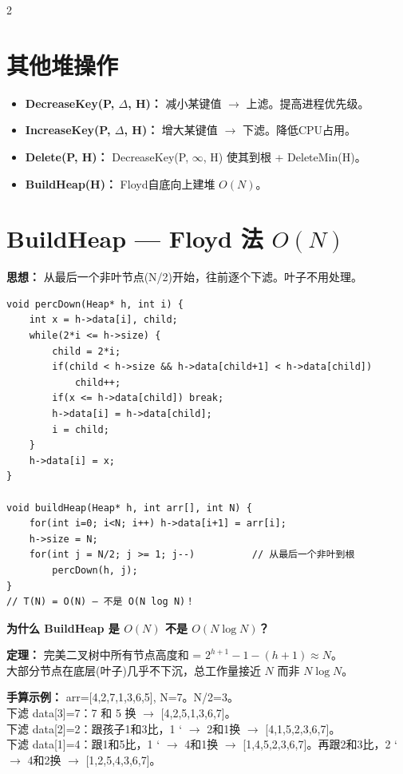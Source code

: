 \documentclass[10pt,a4paper]{article}
\begin{document}
\begin{multicols}{2}
\columnbreak

\section*{其他堆操作}

\begin{itemize}
\item \textbf{DecreaseKey(P, $\Delta$, H)：} 减小某键值 $\to$ 上滤。提高进程优先级。
\item \textbf{IncreaseKey(P, $\Delta$, H)：} 增大某键值 $\to$ 下滤。降低CPU占用。
\item \textbf{Delete(P, H)：} DecreaseKey(P, $\infty$, H) 使其到根 + DeleteMin(H)。
\item \textbf{BuildHeap(H)：} Floyd自底向上建堆 $O(N)$。
\end{itemize}

\section*{BuildHeap — Floyd 法 $O(N)$}

\textbf{思想：} 从最后一个非叶节点(N/2)开始，往前逐个下滤。叶子不用处理。

\begin{lstlisting}
void percDown(Heap* h, int i) {
    int x = h->data[i], child;
    while(2*i <= h->size) {
        child = 2*i;
        if(child < h->size && h->data[child+1] < h->data[child])
            child++;
        if(x <= h->data[child]) break;
        h->data[i] = h->data[child];
        i = child;
    }
    h->data[i] = x;
}

void buildHeap(Heap* h, int arr[], int N) {
    for(int i=0; i<N; i++) h->data[i+1] = arr[i];
    h->size = N;
    for(int j = N/2; j >= 1; j--)          // 从最后一个非叶到根
        percDown(h, j);
}
// T(N) = O(N) — 不是 O(N log N)！
\end{lstlisting}

\begin{keybox}
\textbf{为什么 BuildHeap 是 $O(N)$ 不是 $O(N\log N)$？}

\textbf{定理：} 完美二叉树中所有节点高度和 = $2^{h+1}-1-(h+1) \approx N$。\\
大部分节点在底层(叶子)几乎不下沉，总工作量接近 $N$ 而非 $N\log N$。
\end{keybox}

\textbf{手算示例：} arr=[4,2,7,1,3,6,5], N=7。N/2=3。\\
下滤 data[3]=7：7 和 5 换 $\to$ [4,2,5,1,3,6,7]。\\
下滤 data[2]=2：跟孩子1和3比，1 \char` $\to$ 2和1换 $\to$ [4,1,5,2,3,6,7]。\\
下滤 data[1]=4：跟1和5比，1 \char` $\to$ 4和1换 $\to$ [1,4,5,2,3,6,7]。再跟2和3比，2 \char` $\to$ 4和2换 $\to$ [1,2,5,4,3,6,7]。


\end{multicols}
\end{document}
